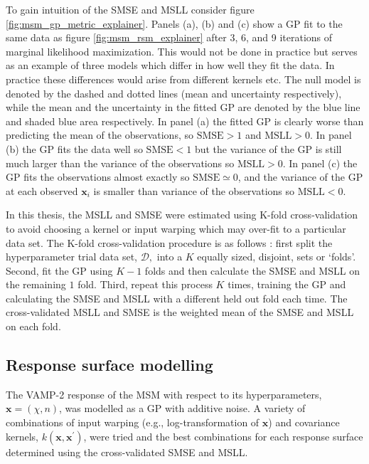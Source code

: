 To gain intuition of the SMSE and MSLL consider figure \ref{fig:msm_gp_metric_explainer}. Panels (a), (b) and (c) show a GP fit to the same data as figure \ref{fig:msm_rsm_explainer} after 3, 6, and 9 iterations of marginal likelihood maximization. This would not be done in practice but serves as an example of three models which differ in how well they fit the data. In practice these differences would arise from different kernels etc. The null model is denoted by the dashed and dotted lines (mean and uncertainty respectively), while the mean and the uncertainty in the fitted GP are denoted by the blue line and shaded blue area respectively.  In panel (a) the fitted GP is clearly worse than predicting the mean of the observations, so  $\mathrm{SMSE} > 1$ and  $\mathrm{MSLL} > 0$. In panel (b) the GP fits the data well so $\mathrm{SMSE} < 1$ but the variance of the GP is still much larger than the variance of the observations so $\mathrm{MSLL} > 0$. In panel (c) the GP fits the observations almost exactly so $\mathrm{SMSE} \simeq 0$, and the variance of the GP at each observed $\mathbf{x}_{i}$ is smaller than variance of the observations so $\mathrm{MSLL} < 0$. 

In this thesis, the MSLL and SMSE were estimated using K-fold cross-validation \cite{friedman2001elements} to avoid choosing a kernel or input warping which may over-fit to a particular data set. The K-fold cross-validation procedure is as follows \cite{friedman2001elements}: first split the hyperparameter trial data set, $\mathcal{D},$ into a $K$ equally sized, disjoint, sets or `folds'. Second, fit the GP using $K-1$ folds and then calculate the SMSE and MSLL on the remaining $1$ fold. Third, repeat this process $K$ times, training the GP and calculating the SMSE and MSLL with a different held out fold each time. The cross-validated MSLL and SMSE is the weighted mean of the SMSE and MSLL on each fold. 

\subsection{Response surface modelling}\label{subsec:rsm}
The VAMP-2 response of the MSM with respect to its hyperparameters, $\mathbf{x} = (\chi, n)$, was modelled as a GP with additive noise. A variety of combinations of input warping (e.g., log-transformation of $\mathbf{x}$) and covariance kernels, $k(\mathbf{x}, \mathbf{x}^{\prime})$,  were tried and the best combinations for each response surface determined using the cross-validated SMSE and MSLL. 

